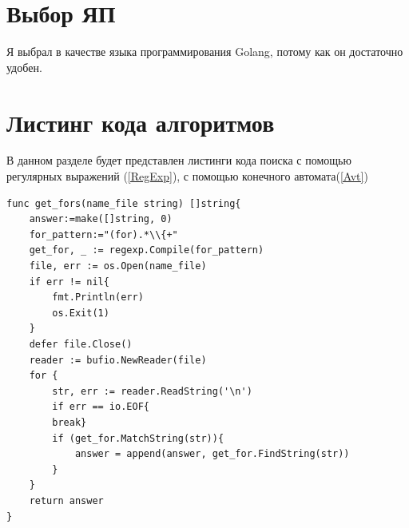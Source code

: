 \documentclass[12pt]{report}
\begin{document}
\section{Выбор ЯП}
Я выбрал в качестве языка программирования Golang, потому как он достаточно удобен.

\section{Листинг кода алгоритмов}
В данном разделе будет представлен листинги кода поиска с помощью регулярных выражений (\ref{RegExp}), с помощью конечного автомата(\ref{Avt})
\begin{lstlisting}[label=RegExp,caption = Использование регулярных выражений]
func get_fors(name_file string) []string{
	answer:=make([]string, 0)
	for_pattern:="(for).*\\{+"
	get_for, _ := regexp.Compile(for_pattern)
	file, err := os.Open(name_file)
	if err != nil{
		fmt.Println(err)
		os.Exit(1)
	}
	defer file.Close()
	reader := bufio.NewReader(file)
	for {
		str, err := reader.ReadString('\n')
		if err == io.EOF{
		break}
		if (get_for.MatchString(str)){
			answer = append(answer, get_for.FindString(str))
		}
	}
	return answer
}
\end{lstlisting}
\end{document}
